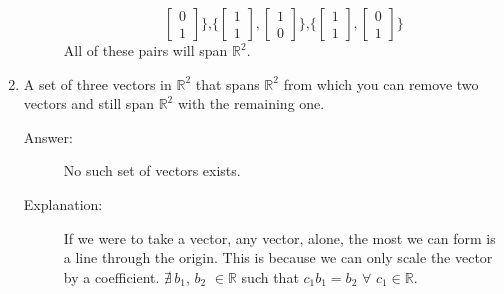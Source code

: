 \documentclass{article}
\begin{document}
\begin{enumerate}
\begin{description}
\[                                        \begin{bmatrix}0 \\ 1\end{bmatrix}
                                    \}\text{,}
                                    \{                                                                          
                                        \begin{bmatrix}1 \\ 1\end{bmatrix},
                                        \begin{bmatrix}1 \\ 0\end{bmatrix}
                                    \}\text{,}
                                    \{
                                        \begin{bmatrix}1 \\ 1\end{bmatrix},
                                        \begin{bmatrix}0 \\ 1\end{bmatrix}
                                    \}
                                    \]
                                    All of these pairs will span $\mathbb{R}^2$.
                            \end{description}
                        \item 
                            A set of three vectors in $\mathbb{R}^2$ that spans $\mathbb{R}^2$ from which you can remove two
                            vectors and still span $\mathbb{R}^2$ with the remaining one.
                            \begin{description}
                                \item[Answer:] 
                                    No such set of vectors exists.
                                \item[Explanation:]
                                    If we were to take a vector, any vector, alone, the most we can form is a line
                                    through the origin. This is because we can only scale the vector by a coefficient.
                                    $\nexists\,b_1$, $b_2$ $ \in \mathbb{R}$ such that $c_1b_1 = b_2$ $\forall$ $c_1 \in \mathbb{R}$.
                            \end{description}


                                    
                    \end{enumerate}
\end{document}
